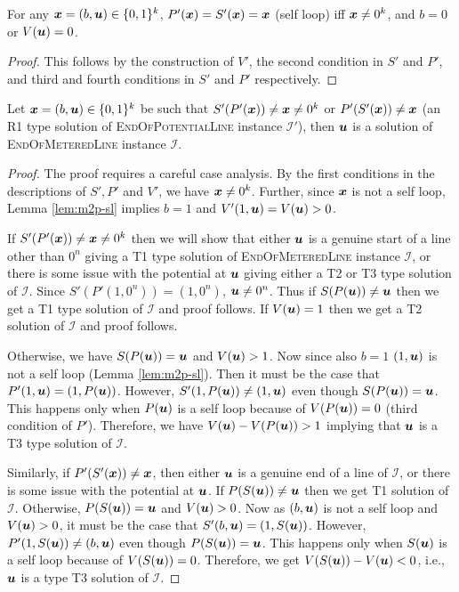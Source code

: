 \documentclass[a4paper,UKenglish]{lipics2}
\theoremstyle{definition}
\def\problem#1{\textsc{#1}}
\def\EOPL{\problem{EndOfPotentialLine}\xspace}
\def\EOML{\problem{EndOfMeteredLine}\xspace}
\newcommand{\CI}{\mbox{${\mathcal I}$}}
\newcommand{\uu}{\mbox{\boldmath $u$}}
\newcommand{\xx}{\mbox{\boldmath $x$}}
\begin{document}
\begin{lemma}\label{lem:m2p-sl}
For any $\xx=(b,\uu)\in \{0,1\}^k$, $P'(\xx)=S'(\xx)=\xx$ (self loop) iff $\xx\neq 0^k$, and $b=0$ or $V(\uu)=0$.
\end{lemma}
\begin{proof}
This follows by the construction of $V'$, the second condition in $S'$ and $P'$, and third and fourth conditions in $S'$ and $P'$ respectively. 
\end{proof}

\begin{lemma}\label{lem:m2p-r1}
Let $\xx=(b,\uu)\in \{0,1\}^k$ be such that $S'(P'(\xx))\neq \xx \neq 0^k$ or $P'(S'(\xx))\neq \xx$ (an R1 type solution of \EOPL instance $\CI'$), then $\uu$ is a solution of \EOML instance $\CI$.
\end{lemma}
\begin{proof}
The proof requires a careful case analysis. 
By the first conditions in the descriptions of $S',P'$ and $V'$, we have $\xx \neq 0^k$. 
Further, since $\xx$ is not a self loop, Lemma \ref{lem:m2p-sl} implies $b=1$  and $V'(1,\uu)=V(\uu)>0$.
\medskip

If $S'(P'(\xx))\neq \xx\neq 0^k$ then we will show that either $\uu$ is a genuine start of a line other than $0^n$ giving a T1 type solution of \EOML instance $\CI$, or there is some issue with the potential at $\uu$ giving either a T2 or T3 type solution of $\CI$. Since $S'(P'(1,0^n))=(1,0^n)$, $\uu \neq 0^n$. Thus if $S(P(\uu))\neq \uu$ then we get a T1 type solution of $\CI$ and proof follows. If $V(\uu)=1$ then we get a T2 solution of $\CI$ and proof follows. 

Otherwise, we have $S(P(\uu))=\uu$ and $V(\uu)>1$. Now since also $b=1$ $(1,\uu)$ is not a self loop (Lemma \ref{lem:m2p-sl}). %
Then it must be the case that $P'(1,\uu)=(1,P(\uu))$. However, $S'(1,P(\uu))\neq (1,\uu)$ even though $S(P(\uu))=\uu$. This happens only when $P(\uu)$ is a self loop because of $V(P(\uu))=0$ (third condition of $P'$).
Therefore, we have $V(\uu)-V(P(\uu))>1$ implying that $\uu$ is a T3 type solution of $\CI$. 
\medskip

Similarly, if $P'(S'(\xx))\neq \xx$, then either $\uu$ is a genuine end of a line of $\CI$, or there is some issue with the potential at $\uu$. If $P(S(\uu))\neq \uu$ then we get T1 solution of $\CI$. Otherwise, $P(S(\uu))=\uu$ and $V(\uu)>0$. Now as $(b,\uu)$ is not a self loop and $V(\uu)>0$, it must be the case that $S'(b,\uu)=(1,S(\uu))$. However, $P'(1, S(\uu))\neq (b,\uu)$ even though $P(S(\uu))=\uu$. This happens only when $S(\uu)$ is a self loop because of $V(S(\uu))=0$. Therefore, we get $V(S(\uu))-V(\uu)<0$, i.e., $\uu$ is a type T3 solution of $\CI$. 
\end{proof}
\end{document}
